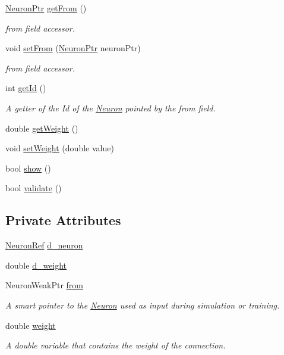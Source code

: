 \begin{DoxyCompactItemize}
\hyperlink{_a_m_o_r_e_8h_ac1ea936c2c7728eb382278131652fef4}{NeuronPtr} \hyperlink{class_con_a0c126eb4479324b156768e0810723423}{getFrom} ()
\begin{DoxyCompactList}\small\item\em from field accessor. \end{DoxyCompactList}\item 
void \hyperlink{class_con_a927378392a3ee1fe958b1670cb72e61d}{setFrom} (\hyperlink{_a_m_o_r_e_8h_ac1ea936c2c7728eb382278131652fef4}{NeuronPtr} neuronPtr)
\begin{DoxyCompactList}\small\item\em from field accessor. \end{DoxyCompactList}\item 
int \hyperlink{class_con_ad12ce81a557eadb2a00b10d5b5f4adb6}{getId} ()
\begin{DoxyCompactList}\small\item\em A getter of the Id of the \hyperlink{class_neuron}{Neuron} pointed by the from field. \end{DoxyCompactList}\item 
double \hyperlink{class_con_a385c5bf6eb9e2ffc94c5b427c287ccb2}{getWeight} ()
\item 
void \hyperlink{class_con_ad5c1a25a2ded72999bf5293f5e55d7d9}{setWeight} (double value)
\item 
bool \hyperlink{class_con_ab85838575b5e01f3b8073136f2102922}{show} ()
\item 
bool \hyperlink{class_con_af5f836a7b0988b3d9113589b2959d5e6}{validate} ()
\end{DoxyCompactItemize}
\subsection*{Private Attributes}
\begin{DoxyCompactItemize}
\item 
\hyperlink{_a_m_o_r_e_8h_ae4f8e0af6c35f16f9f1d3588d8915cf6}{NeuronRef} \hyperlink{class_con_aad857bd289343ecff2153acc852f34f0}{d\_\-neuron}
\item 
double \hyperlink{class_con_a41e043e0dfb126f3bdacbbd8caf33672}{d\_\-weight}
\item 
NeuronWeakPtr \hyperlink{class_con_a7c05f90dff56fd26c1fa0f042bba67a6}{from}
\begin{DoxyCompactList}\small\item\em A smart pointer to the \hyperlink{class_neuron}{Neuron} used as input during simulation or training. \end{DoxyCompactList}\item 
double \hyperlink{class_con_a7f46485ba5b41971ea38641f9e7d1be0}{weight}
\begin{DoxyCompactList}\small\item\em A double variable that contains the weight of the connection. \end{DoxyCompactList}\end{DoxyCompactItemize}


